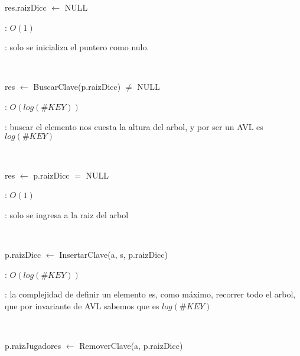 \begin{Algoritmos}

	\begin{algorithm}[H]
		\NoCaptionOfAlgo
		\caption{}
		res.raizDicc $\leftarrow$ NULL
	\end{algorithm}

	\complejidad: $O(1)$

	\justifcomp: solo se inicializa el puntero como nulo.

	~

	\begin{algorithm}[H]
		\NoCaptionOfAlgo
		\caption{}
		res $\leftarrow$ BuscarClave(p.raizDicc) $\neq$ NULL
	\end{algorithm}

	\complejidad: $O(log(\#KEY))$

	\justifcomp: buscar el elemento nos cuesta la altura del arbol, y por ser un AVL es $log(\#KEY)$

	~

	\begin{algorithm}[H]
		\NoCaptionOfAlgo
		\caption{}
		res $\leftarrow$ p.raizDicc $=$ NULL
	\end{algorithm}

	\complejidad: $O(1)$

	\justifcomp: solo se ingresa a la raiz del arbol

	~

	\begin{algorithm}[H]
		\NoCaptionOfAlgo
		\caption{}
		p.raizDicc $\leftarrow$ InsertarClave(a, s, p.raizDicc)
	\end{algorithm}

	\complejidad: $O(log(\#KEY))$

	\justifcomp: la complejidad de definir un elemento es, como máximo, recorrer todo el arbol, que por invariante de AVL sabemos que es $log(\#KEY)$


	~

	\begin{algorithm}[H]
		\NoCaptionOfAlgo
		\caption{}
		p.raizJugadores $\leftarrow$ RemoverClave(a, p.raizDicc)
	\end{algorithm}


\end{Algoritmos}
